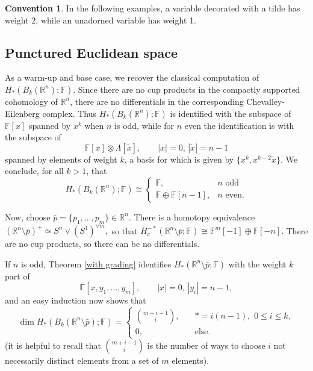 \documentclass{compositio}
\theoremstyle{definition}\newtheorem{definition}{Definition}[section]
\theoremstyle{theorem}\newtheorem{lemma}[definition]{Lemma}
\theoremstyle{remark}\newtheorem*{conventions}{Conventions}
\theoremstyle{remark}\newtheorem*{acknowledgments}{Acknowledgments}
\theoremstyle{remark}\newtheorem*{outline}{Outline}
\theoremstyle{remark}\newtheorem*{questions}{Questions}
\theoremstyle{remark}\newtheorem{example}[definition]{Example}
\theoremstyle{definition}\newtheorem{construction}[definition]{Construction}
\theoremstyle{definition}\newtheorem*{convention}{Convention}
\theoremstyle{definition}\newtheorem*{conjecture}{Conjecture}
\theoremstyle{theorem}\newtheorem{theorem}[definition]{Theorem}
\theoremstyle{theorem}\newtheorem{paradigm}[definition]{Paradigm}
\theoremstyle{remark}\newtheorem{remark}[definition]{Remark}
\theoremstyle{corollary}\newtheorem{corollary}[definition]{Corollary}
\theoremstyle{theorem}\newtheorem{proposition}[definition]{Proposition}
\theoremstyle{definition}\newtheorem{question}[definition]{Question}
\begin{document}
\begin{convention} In the following examples, a variable decorated with a tilde has weight 2, while an unadorned variable has weight 1.
\end{convention}

\subsection{Punctured Euclidean space}

As a warm-up and base case, we recover the classical computation of $H_*(B_k(\mathbb{R}^n);\mathbb{F})$. Since there are no cup products in the compactly supported cohomology of $\mathbb{R}^n$, there are no differentials in the corresponding Chevalley-Eilenberg complex. Thus $H_*(B_k(\mathbb{R}^n);\mathbb{F})$ is identified with the subspace of $\mathbb{F}[x]$ spanned by $x^k$ when $n$ is odd, while for $n$ even the identification is with the subspace of $$\mathbb{F}[x]\otimes\Lambda[\tilde x],\qquad |x|=0,\,|\tilde x|=n-1$$ spanned by elements of weight $k$, a basis for which is given by $\{x^k, x^{k-2}\tilde x\}$. We conclude, for all $k>1$, that $$H_*(B_k(\mathbb{R}^n);\mathbb{F})\cong\begin{cases}
\mathbb{F},\qquad\qquad& n\text{ odd}\\
\mathbb{F}\oplus\mathbb{F}[n-1], &n\text{ even}.
\end{cases}$$

Now, choose $\bar p=\{p_1,\ldots, p_m\}\in\mathbb{R}^n$. There is a homotopy equivalence $(\mathbb{R}^n\setminus\bar p)^+\simeq S^{n}\vee (S^1)^{\vee m},$ so that $H_c^{-*}(\mathbb{R}^n\setminus\bar p;\mathbb{F})\cong\mathbb{F}^m[-1]\oplus\mathbb{F}[-n].$ There are no cup products, so there can be no differentials.

If $n$ is odd, Theorem \ref{with grading} identifies $H_*(\mathbb{R}^n\setminus\bar p;\mathbb{F})$ with the weight $k$ part of $$\mathbb{F}[x,y_1,\ldots, y_m],\qquad |x|=0,\, |y_i|=n-1,$$ and an easy induction now shows that $$ \dim H_*(B_k(\mathbb{R}^n\setminus\bar p);\mathbb{F})=\begin{cases}
\binom{m+i-1}{i},\quad &*=i(n-1), \,\,0\leq i\leq k,\\
0,\quad &\text{else.}
\end{cases}$$ (it is helpful to recall that $\binom{m+i-1}{i}$ is the number of ways to choose $i$ not necessarily distinct elements from a set of $m$ elements).
\end{document}
